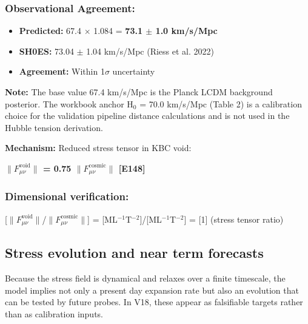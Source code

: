 \documentclass[11pt,a4paper]{article}
\begin{document}
\begin{mdframed}[linecolor=accent,linewidth=0.5pt,backgroundcolor=callout-bg,leftline=true,rightline=true,topline=true,bottomline=true,innerleftmargin=8pt,innerrightmargin=8pt,innertopmargin=6pt,innerbottommargin=6pt]
\subsubsection{Observational Agreement:}
\begin{itemize}
  \item \textbf{Predicted:} 67.4 $\times$ 1.084 = \textbf{73.1 $\pm$ 1.0 km/\allowbreak{}s/\allowbreak{}Mpc}
  \item \textbf{SH0ES:} 73.04 $\pm$ 1.04 km/\allowbreak{}s/\allowbreak{}Mpc (Riess et al. 2022)
  \item \textbf{Agreement:} Within 1$\sigma$ uncertainty
\end{itemize}

\textbf{Note:} The base value 67.4 km/\allowbreak{}s/\allowbreak{}Mpc is the Planck LCDM background posterior. The workbook anchor H$_{0}$ = 70.0 km/\allowbreak{}s/\allowbreak{}Mpc (Table 2) is a calibration choice for the validation pipeline distance calculations and is not used in the Hubble tension derivation.
\end{mdframed}

\textbf{Mechanism:} Reduced stress tensor in KBC void:

\textbf{$\|$$F^{\text{void}}_{\mu\nu}$$\|$ = 0.75 $\|$$F^{\text{cosmic}}_{\mu\nu}$$\|$ [E148]}

\begin{mdframed}[linecolor=accent,linewidth=0.5pt,backgroundcolor=callout-bg,leftline=true,rightline=true,topline=true,bottomline=true,innerleftmargin=8pt,innerrightmargin=8pt,innertopmargin=6pt,innerbottommargin=6pt]
\subsubsection{Dimensional verification:}
[$\|$$F^{\text{void}}_{\mu\nu}$$\|$/$\|$$F^{\text{cosmic}}_{\mu\nu}$$\|$] = [ML$^{-1}$T$^{-2}$]/[ML$^{-1}$T$^{-2}$] = [1] \checkmark{} (stress tensor ratio)
\end{mdframed}

\subsection{Stress evolution and near term forecasts}
Because the stress field is dynamical and relaxes over a finite timescale, the model implies not only a present day expansion rate but also an evolution that can be tested by future probes. In V18, these appear as falsifiable targets rather than as calibration inputs.
\end{document}
